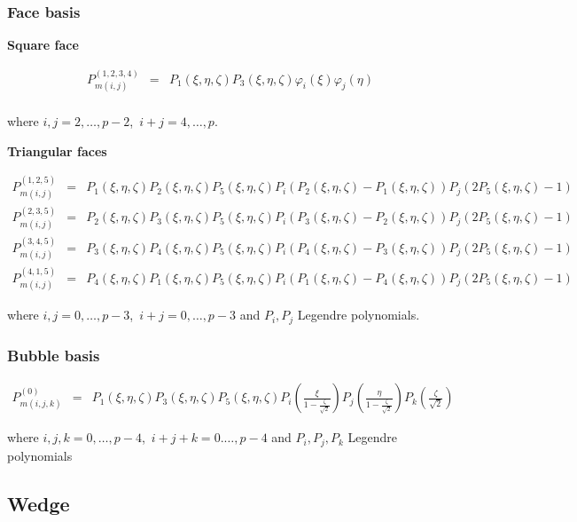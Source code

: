 \subsubsection{Face basis}

\noindent \textbf{Square face}

\begin{eqnarray*} 
P_{m(i,j)}^{(1,2,3,4)}&=&P_1(\xi,\eta,\zeta)P_3(\xi,\eta,\zeta)
\varphi_i(\xi)\varphi_j(\eta) \\ 
\end{eqnarray*}

\noindent where $i,j=2,\ldots,p-2$,\ $i+j=4,\ldots,p$. 

\noindent \textbf{Triangular faces}

\begin{eqnarray*}
P_{m(i,j)}^{(1,2,5)}&=&P_1(\xi,\eta,\zeta)P_2(\xi,\eta,\zeta)
P_5(\xi,\eta,\zeta)
P_i(P_2(\xi,\eta,\zeta)-P_1(\xi,\eta,\zeta))
P_j(2P_5(\xi,\eta,\zeta)-1) \\
P_{m(i,j)}^{(2,3,5)}&=&P_2(\xi,\eta,\zeta)P_3(\xi,\eta,\zeta)
P_5(\xi,\eta,\zeta)
P_i(P_3(\xi,\eta,\zeta)-P_2(\xi,\eta,\zeta))
P_j(2P_5(\xi,\eta,\zeta)-1) \\
P_{m(i,j)}^{(3,4,5)}&=&P_3(\xi,\eta,\zeta)P_4(\xi,\eta,\zeta)
P_5(\xi,\eta,\zeta)
P_i(P_4(\xi,\eta,\zeta)-P_3(\xi,\eta,\zeta))
P_j(2P_5(\xi,\eta,\zeta)-1) \\
P_{m(i,j)}^{(4,1,5)}&=&P_4(\xi,\eta,\zeta)P_1(\xi,\eta,\zeta)
P_5(\xi,\eta,\zeta)
P_i(P_1(\xi,\eta,\zeta)-P_4(\xi,\eta,\zeta))
P_j(2P_5(\xi,\eta,\zeta)-1)
\end{eqnarray*}

\noindent where $i,j=0,\ldots,p-3$,\ $i+j=0,\ldots,p-3$ and $P_i,P_j$
Legendre polynomials.

\subsubsection{Bubble basis} 

\begin{eqnarray*}
P_{m(i,j,k)}^{(0)}&=&P_1(\xi,\eta,\zeta)P_3(\xi,\eta,\zeta)
P_5(\xi,\eta,\zeta)P_i(\frac{\xi}{1-\frac{\zeta}{\sqrt{2}}})
P_j(\frac{\eta}{1-\frac{\zeta}{\sqrt{2}}})P_k(\frac{\zeta}{\sqrt{2}})
\end{eqnarray*}

\noindent where $i,j,k=0,\ldots,p-4$,\ $i+j+k=0.\ldots,p-4$ and
$P_i,P_j,P_k$ Legendre polynomials

\subsection{Wedge}

